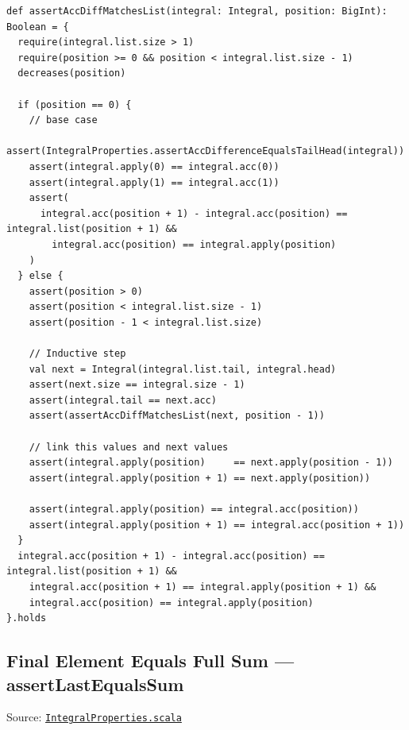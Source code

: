 \begin{lstlisting}[style=scala]
def assertAccDiffMatchesList(integral: Integral, position: BigInt): Boolean = {
  require(integral.list.size > 1)
  require(position >= 0 && position < integral.list.size - 1)
  decreases(position)

  if (position == 0) {
    // base case
    assert(IntegralProperties.assertAccDifferenceEqualsTailHead(integral))
    assert(integral.apply(0) == integral.acc(0))
    assert(integral.apply(1) == integral.acc(1))
    assert(
      integral.acc(position + 1) - integral.acc(position) == integral.list(position + 1) &&
        integral.acc(position) == integral.apply(position)
    )
  } else {
    assert(position > 0)
    assert(position < integral.list.size - 1)
    assert(position - 1 < integral.list.size)

    // Inductive step
    val next = Integral(integral.list.tail, integral.head)
    assert(next.size == integral.size - 1)
    assert(integral.tail == next.acc)
    assert(assertAccDiffMatchesList(next, position - 1))

    // link this values and next values
    assert(integral.apply(position)     == next.apply(position - 1))
    assert(integral.apply(position + 1) == next.apply(position))

    assert(integral.apply(position) == integral.acc(position))
    assert(integral.apply(position + 1) == integral.acc(position + 1))
  }
  integral.acc(position + 1) - integral.acc(position) == integral.list(position + 1) &&
    integral.acc(position + 1) == integral.apply(position + 1) &&
    integral.acc(position) == integral.apply(position)
}.holds
\end{lstlisting}

\subsection{Final Element Equals Full Sum --- assertLastEqualsSum}

Source:
\href{https://github.com/thiagomata/prime-numbers/blob/master/src/main/scala/v1/chapter3/list/integral/properties/IntegralProperties.scala}{\texttt{IntegralProperties.scala}}

